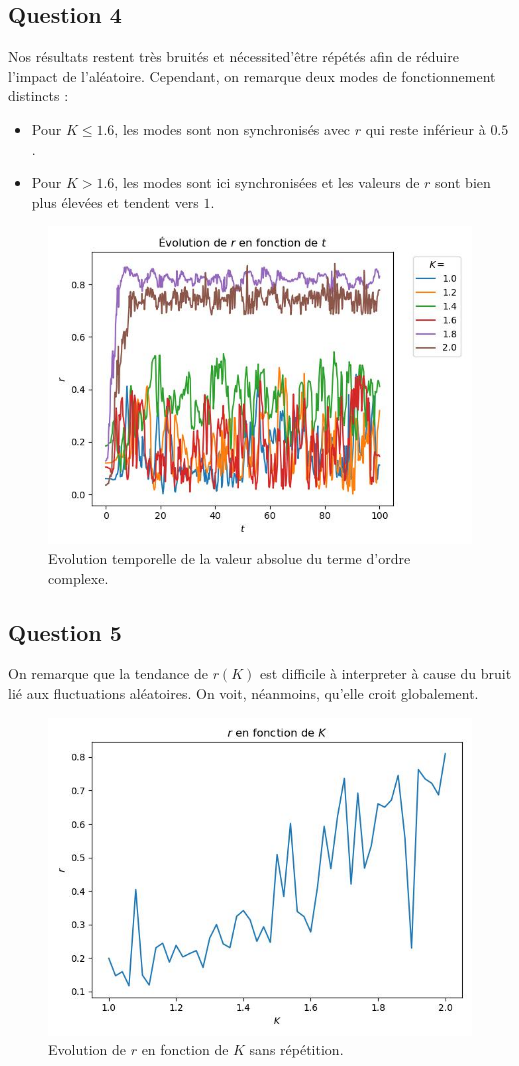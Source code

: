 \documentclass[a4paper, 11pt]{article}
\begin{document}
\subsection*{Question 4}
Nos résultats restent très bruités et nécessited'être répétés afin de réduire l'impact de l'aléatoire.
Cependant, on remarque deux modes de fonctionnement distincts :
\begin{itemize}
    \item Pour $K \leq 1.6$, les modes sont non synchronisés avec $r$ qui reste inférieur à $0.5$.
    \item Pour $K > 1.6$, les modes sont ici synchronisées et les valeurs de $r$ sont bien plus élevées et tendent vers $1$.
\end{itemize}
\begin{figure}[H]
    \centering
    \includegraphics[width=0.6\linewidth]{pics/kura4.jpg}
    \caption{Evolution temporelle de la valeur absolue du terme d'ordre complexe.}
\end{figure}

\subsection*{Question 5}
On remarque que la tendance de $r(K)$ est difficile à interpreter à cause du bruit lié aux fluctuations aléatoires. On voit, néanmoins, qu'elle croit globalement.
\begin{figure}[H]
    \centering
    \includegraphics[width=0.5\linewidth]{pics/kura5.jpg}
    \caption{Evolution de $r$ en fonction de $K$ sans répétition.}
\end{figure}
\end{document}
